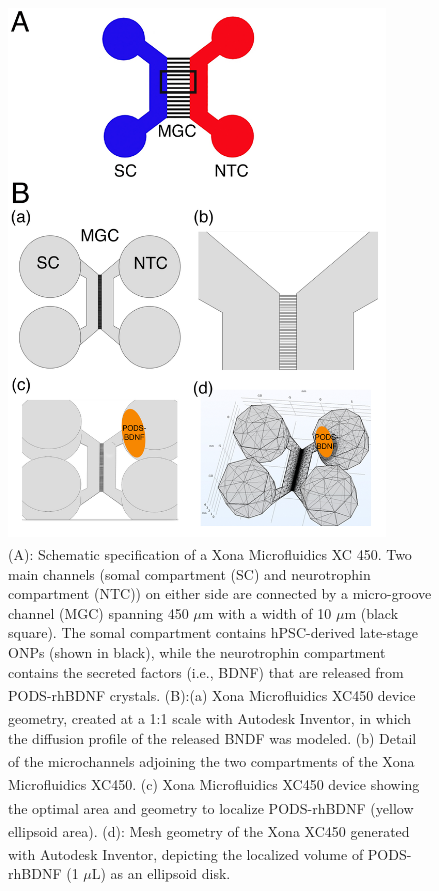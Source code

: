 \documentclass[review]{elsarticle}
\begin{document}
\begin{figure}
	\begin{center}
		\includegraphics[width=10cm]{Fig_3.jpg} %
	\end{center}
	\caption{(A): Schematic specification of a Xona\textsuperscript{\texttrademark} Microfluidics XC 450. Two main channels (somal compartment (SC) and neurotrophin compartment (NTC)) on either side are connected by a micro-groove channel (MGC) spanning 450 $\mu$m with a width of 10 $\mu$m (black square). The somal compartment contains hPSC-derived late-stage ONPs (shown in black), while the neurotrophin compartment contains the secreted factors (i.e., BDNF) that are released from PODS\textsuperscript{\textregistered}-rhBDNF crystals. (B):(a) Xona \textsuperscript{\texttrademark} Microfluidics XC450 device geometry, created at a 1:1 scale with Autodesk Inventor\textsuperscript{\textregistered}, in which the diffusion profile of the released BNDF was modeled. (b) Detail of the microchannels adjoining the two compartments of the Xona \textsuperscript{\texttrademark} Microfluidics XC450.  (c) Xona \textsuperscript{\texttrademark} Microfluidics XC450 device showing the optimal area and geometry to localize PODS\textsuperscript{\textregistered}-rhBDNF (yellow ellipsoid area). (d): Mesh geometry of the Xona\textsuperscript{\texttrademark} XC450 generated with Autodesk Inventor, depicting the localized volume of PODS\textsuperscript{\textregistered}-rhBDNF (1 $\mu$L) as an ellipsoid disk.}
\end{figure}
\end{document}
